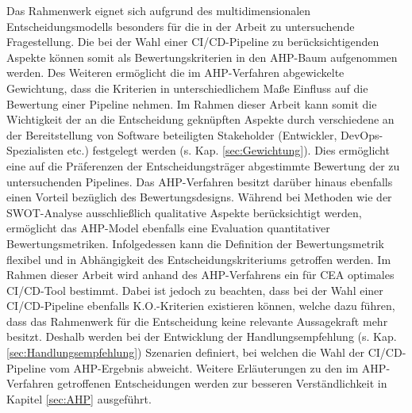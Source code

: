 Das Rahmenwerk eignet sich aufgrund des multidimensionalen Entscheidungsmodells besonders für die in der Arbeit zu untersuchende Fragestellung. Die bei der Wahl einer CI/CD-Pipeline zu berücksichtigenden Aspekte können somit als Bewertungskriterien in den AHP-Baum aufgenommen werden. Des Weiteren ermöglicht die im AHP-Verfahren abgewickelte Gewichtung, dass die Kriterien in unterschiedlichem Maße Einfluss auf die Bewertung einer Pipeline nehmen. Im Rahmen dieser Arbeit kann somit die Wichtigkeit der an die Entscheidung geknüpften Aspekte durch verschiedene an der Bereitstellung von Software beteiligten Stakeholder (Entwickler, DevOps-Spezialisten etc.) festgelegt werden (s. Kap. \ref{sec:Gewichtung}). Dies ermöglicht eine auf die Präferenzen der Entscheidungsträger abgestimmte Bewertung der zu untersuchenden Pipelines. Das AHP-Verfahren besitzt darüber hinaus ebenfalls einen Vorteil bezüglich des Bewertungsdesigns. Während bei Methoden wie der SWOT-Analyse ausschließlich qualitative Aspekte berücksichtigt werden, ermöglicht das AHP-Model ebenfalls eine Evaluation quantitativer Bewertungsmetriken. Infolgedessen kann die Definition der Bewertungsmetrik flexibel und in Abhängigkeit des Entscheidungskriteriums getroffen werden. Im Rahmen dieser Arbeit wird anhand des AHP-Verfahrens ein für CEA optimales CI/CD-Tool bestimmt. Dabei ist jedoch zu beachten, dass bei der Wahl einer CI/CD-Pipeline ebenfalls K.O.-Kriterien existieren können, welche dazu führen, dass das Rahmenwerk für die Entscheidung keine relevante Aussagekraft mehr besitzt. Deshalb werden bei der Entwicklung der Handlungsempfehlung (s. Kap. \ref{sec:Handlungsempfehlung}) Szenarien definiert, bei welchen die Wahl der CI/CD-Pipeline vom AHP-Ergebnis abweicht. Weitere Erläuterungen zu den im AHP-Verfahren getroffenen Entscheidungen werden zur besseren Verständlichkeit in Kapitel \ref*{sec:AHP} ausgeführt. 